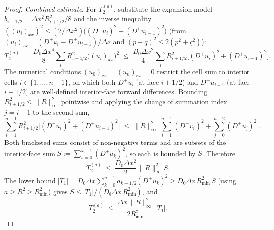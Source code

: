 \documentclass[10pt,a4paper]{amsart}
\begin{document}
\begin{proof}
    \emph{Combined estimate.}
    For $T_2^{(a)}$, substitute the expansion-model $b_{i+1/2} = \Delta x^2 R_{i+1/2}^2/8$ and the inverse inequality $((u_i)_{xx})^2 \leq (2/\Delta x^2)\big((D^+ u_i)^2 + (D^+ u_{i-1})^2\big)$ (from $(u_i)_{xx} = (D^+ u_i - D^+ u_{i-1})/\Delta x$ and $(p-q)^2 \le 2(p^2 + q^2)$):
    \begin{equation}
        T_2^{(a)} \;=\; \frac{D_0 \Delta x^4}{8} \sum_i R_{i+1/2}^2 \big((u_i)_{xx}\big)^2 \;\leq\; \frac{D_0 \Delta x^2}{4} \sum_i R_{i+1/2}^2 \big[(D^+ u_i)^2 + (D^+ u_{i-1})^2\big].
    \end{equation}
    The numerical conditions $(u_0)_{xx} = (u_n)_{xx} = 0$ restrict the cell sum to interior cells $i \in \{1, \ldots, n-1\}$, on which both $D^+ u_i$ (at face $i + 1/2$) and $D^+ u_{i-1}$ (at face $i - 1/2$) are well-defined interior-face forward differences. Bounding $R_{i+1/2}^2 \leq \|R\|_\infty^2$ pointwise and applying the change of summation index $j = i-1$ to the second sum,
    \begin{equation}
        \sum_{i=1}^{n-1} R_{i+1/2}^2 \big[(D^+ u_i)^2 + (D^+ u_{i-1})^2\big] \;\leq\; \|R\|_\infty^2 \bigg[ \sum_{i=1}^{n-1} (D^+ u_i)^2 + \sum_{j=0}^{n-2} (D^+ u_j)^2 \bigg].
    \end{equation}
    Both bracketed sums consist of non-negative terms and are subsets of the interior-face sum $S := \sum_{k=0}^{n-1}(D^+ u_k)^2$, so each is bounded by $S$. Therefore
    \begin{equation}
        T_2^{(a)} \;\leq\; \frac{D_0 \Delta x^2}{2}\, \|R\|_\infty^2\, S. \label{eq:t2a-bound-clean}
    \end{equation}
    The lower bound $|T_1| = D_0 \Delta x \sum_{k=0}^{n-1} a_{k+1/2}(D^+ u_k)^2 \geq D_0 \Delta x\, R_{\min}^2\, S$ (using $a \geq R^2 \geq R_{\min}^2$) gives $S \leq |T_1|/(D_0 \Delta x\, R_{\min}^2)$, and
    \begin{equation}
        T_2^{(a)} \;\leq\; \frac{\Delta x\, \|R\|_\infty^2}{2 R_{\min}^2}\, |T_1|.
    \end{equation}


\end{proof}
\end{document}
